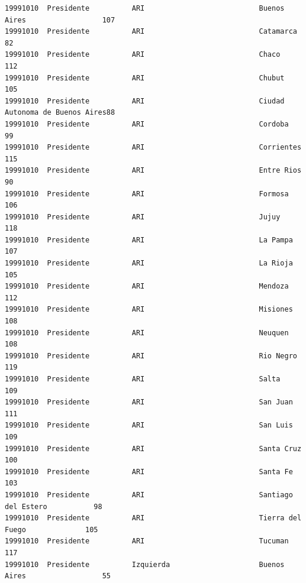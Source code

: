 \documentclass[a4paper,10pt]{article}
\begin{document}
\begin{verbatim}
19991010  Presidente          ARI                           Buenos Aires                  107            
19991010  Presidente          ARI                           Catamarca                     82             
19991010  Presidente          ARI                           Chaco                         112            
19991010  Presidente          ARI                           Chubut                        105            
19991010  Presidente          ARI                           Ciudad Autonoma de Buenos Aires88             
19991010  Presidente          ARI                           Cordoba                       99             
19991010  Presidente          ARI                           Corrientes                    115            
19991010  Presidente          ARI                           Entre Rios                    90             
19991010  Presidente          ARI                           Formosa                       106            
19991010  Presidente          ARI                           Jujuy                         118            
19991010  Presidente          ARI                           La Pampa                      107            
19991010  Presidente          ARI                           La Rioja                      105            
19991010  Presidente          ARI                           Mendoza                       112            
19991010  Presidente          ARI                           Misiones                      108            
19991010  Presidente          ARI                           Neuquen                       108            
19991010  Presidente          ARI                           Rio Negro                     119            
19991010  Presidente          ARI                           Salta                         109            
19991010  Presidente          ARI                           San Juan                      111            
19991010  Presidente          ARI                           San Luis                      109            
19991010  Presidente          ARI                           Santa Cruz                    100            
19991010  Presidente          ARI                           Santa Fe                      103            
19991010  Presidente          ARI                           Santiago del Estero           98             
19991010  Presidente          ARI                           Tierra del Fuego              105            
19991010  Presidente          ARI                           Tucuman                       117            
19991010  Presidente          Izquierda                     Buenos Aires                  55             

\end{verbatim}
\end{document}
